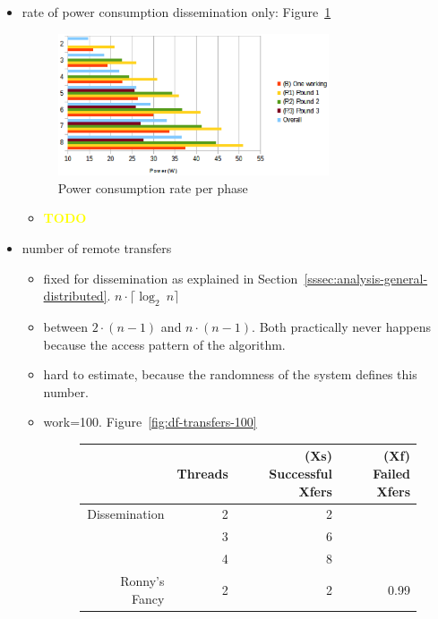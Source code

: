 \documentclass[a4paper, 10pt]{article}
\def \todo{\textbf{\textcolor{yellow}{TODO}}}
\begin{document}
\begin{itemize}
\begin{figure}[htbp]
		\end{figure}
		\begin{itemize}
			\item \todo
		\end{itemize}
	\item rate of power consumption dissemination only: Figure~\ref{fig:d-power-work-1000}
		\begin{figure}[htbp]
			\centering
			\includegraphics[width=8cm]{charts/d-power-work-1000}
			\caption{Power consumption rate per phase}
			\label{fig:d-power-work-1000}
		\end{figure}
		\begin{itemize}
			\item \todo
		\end{itemize}
	\item number of remote transfers
		\begin{itemize}
			\item fixed for dissemination as explained in Section~\ref{sssec:analysis-general-distributed}. $n \cdot \lceil \log _2~n \rceil$
			\item between $2 \cdot (n-1)$ and $n \cdot (n-1)$. Both practically never happens because the access pattern of the algorithm.
			\item hard to estimate, because the randomness of the system defines this number.
			\item work=100. Figure~\ref{fig:df-transfers-100}
				\begin{figure}[htbp]
					\centering
					\begin{tabular}{r | r | r r}
						              & Threads & (Xs) Successful Xfers & (Xf) Failed Xfers \\
						\hline
						Dissemination & 2       & 2                     &                   \\
						              & 3       & 6                     &                   \\
						              & 4       & 8                     &                   \\
						\hline
						Ronny's Fancy & 2       & 2                     & 0.99              \\

\end{tabular}
\end{figure}
\end{itemize}
\end{itemize}
\end{document}
